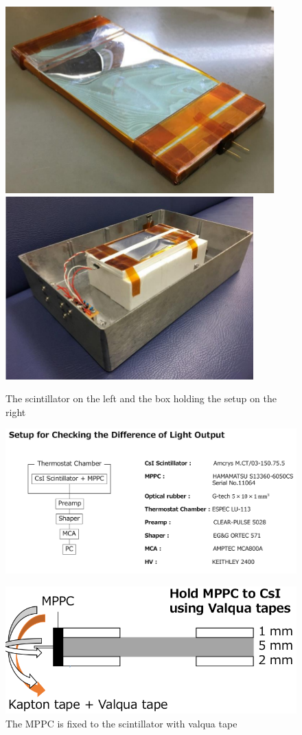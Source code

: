 \documentclass[12pt, a4paper,titlepage]{article}
\numberwithin{equation}{section}
\numberwithin{figure}{section}
\begin{document}
\begin{figure}[htbp]
 \centering %
 \includegraphics[width=.4\textwidth,origin=c,angle=0]{images/1channelsetup.png}
 \qquad
 \includegraphics[width=.4\textwidth,origin=c,angle=0]{images/1channelsetupbox.png} 
 \caption{\label{fig:i} The scintillator on the left and the box holding the setup on the right}
 \end{figure}


\begin{figure}
\includegraphics[width=130.0mm]{images/1channelelectronics.png}
\end{figure}



\begin{figure}
\includegraphics[width=130.0mm]{images/tap1channel.png}
\caption{\label{fig:1channeltape} The MPPC is fixed to the scintillator with valqua tape}
\end{figure}
\end{document}
